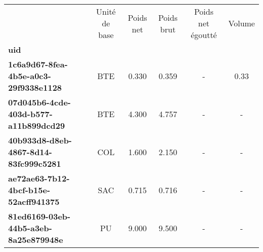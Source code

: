 \begin{tabular}{lccccc}
\toprule
{} & Unité de base &  Poids net &  Poids brut &  Poids net égoutté &  Volume \\
\textbf{uid                                 } &               &            &             &                    &         \\
\midrule
\textbf{1c6a9d67-8fea-4b5e-a0c3-29f9338e1128} &           BTE &      0.330 &       0.359 &                  - &    0.33 \\
\textbf{07d045b6-4cde-403d-b577-a11b899dcd29} &           BTE &      4.300 &       4.757 &                  - &       - \\
\textbf{40b933d8-d8eb-4867-8d14-83fc999c5281} &           COL &      1.600 &       2.150 &                  - &       - \\
\textbf{ae72ae63-7b12-4bcf-b15e-52acff941375} &           SAC &      0.715 &       0.716 &                  - &       - \\
\textbf{81ed6169-03eb-44b5-a3eb-8a25e879948e} &            PU &      9.000 &       9.500 &                  - &       - \\
\bottomrule
\end{tabular}
